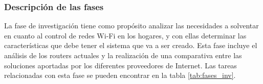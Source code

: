 \documentclass[12pt, twoside]{article}
\begin{document}
        \begin{table}[!htbp]             
        \centering                  
        \caption{Pruebas de encriptación}
        \label{tab:cripto_tests}
    \end{table}

    \subsubsection{Descripción de las fases}
        La fase de investigación tiene como propósito analizar las necesidades a solventar en cuanto al control de redes Wi-Fi en los hogares, y con ellas determinar las características que debe tener el sistema que va a ser creado. Esta fase incluye el análisis de los routers actuales y la realización de una comparativa entre las soluciones aportadas por los diferentes proveedores de Internet. Las tareas relacionadas con esta fase se pueden encontrar en la tabla \ref{tab:fases_inv}.
\end{document}
